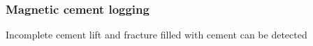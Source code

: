\documentclass[aspectratio=169]{beamer}
\begin{document}
\begin{frame}
\frametitle{Magnetic cement logging}

Incomplete cement lift and fracture filled with cement can be detected

\begin{minipage}[h]{0.21\linewidth}
 \\

\end{minipage}
\end{frame}
\end{document}
